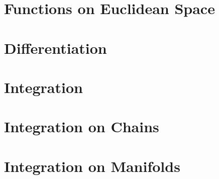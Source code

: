 \documentclass[12pt]{book}
\begin{document}



\large      %





\chapter{Functions on Euclidean Space}




\chapter{Differentiation}








\chapter{Integration}







\chapter{Integration on Chains}





\chapter{Integration on Manifolds}










\end{document}
